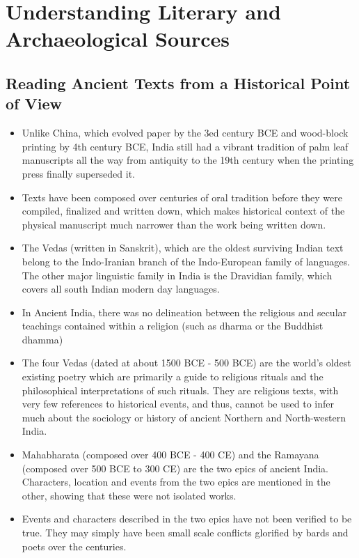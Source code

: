 \section{Understanding Literary and Archaeological Sources}

\subsection{Reading Ancient Texts from a Historical Point of View}
\begin{itemize}
    \item Unlike China, which evolved paper by the 3ed century BCE and wood-block printing by 4th century BCE, India still had a vibrant tradition of palm leaf manuscripts all the way from antiquity to the 19th century when the printing press finally superseded it.
    \item Texts have been composed over centuries of oral tradition before they were compiled, finalized and written down, which makes historical context of the physical manuscript much narrower than the work being written down.
    \item The Vedas (written in Sanskrit), which are the oldest surviving Indian text belong to the Indo-Iranian branch of the Indo-European family of languages. The other major linguistic family in India is the Dravidian family, which covers all south Indian modern day languages.
    \item In Ancient India, there was no delineation between the religious and secular teachings contained within a religion (such as \Gls{dharma} or the Buddhist \Gls{dhamma})
    \item The four Vedas (dated at about 1500 BCE - 500 BCE) are the world's oldest existing poetry which are primarily a guide to religious rituals and the philosophical interpretations of such rituals. They are religious texts, with very few references to historical events, and thus, cannot be used to infer much about the sociology or history of ancient Northern and North-western India.
    \item Mahabharata (composed over 400 BCE - 400 CE) and the Ramayana (composed over 500 BCE to 300 CE) are the two epics of ancient India. Characters, location and events from the two epics are mentioned in the other, showing that these were not isolated works.
    \item Events and characters described in the two epics have not been verified to be true. They may simply have been small scale conflicts glorified by bards and poets over the centuries.

\end{itemize}
